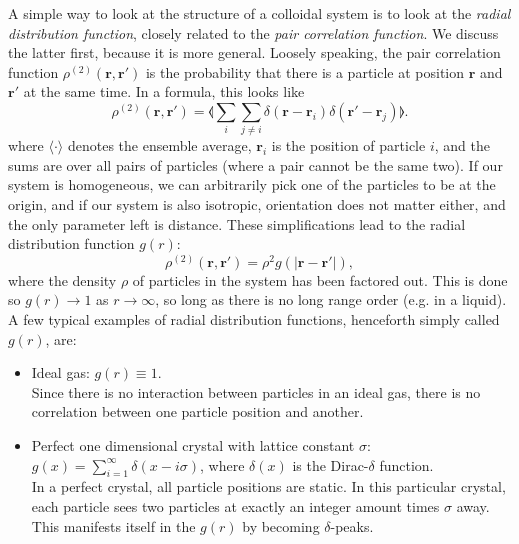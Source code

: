 \documentclass[thesis]{subfiles}
\begin{document}
A simple way to look at the structure of a colloidal system is to look at the \emph{radial distribution function}, closely related to the \emph{pair correlation function}. We discuss the latter first, because it is more general. Loosely speaking, the pair correlation function $\rho^{(2)}(\bm r, \bm r')$ is the probability that there is a particle at position $\bm r$ and $\bm r'$ at the same time. In a formula, this looks like 
\begin{equation}
	\rho^{(2)}(\bm r, \bm r') = \llangle \sum_i \sum_{j \neq i} \delta(\bm r - \bm r_i) \delta(\bm r' - \bm r_j) \rrangle.
\end{equation}
where $\langle \cdot \rangle$ denotes the ensemble average, $\bm r_i$ is the position of particle $i$, and the sums are over all pairs of particles (where a pair cannot be the same two).
If our system is homogeneous, we can arbitrarily pick one of the particles to be at the origin, and if our system is also isotropic, orientation does not matter either, and the only parameter left is distance. These simplifications lead to the radial distribution function $g(r):$
\begin{equation}
	\rho^{(2)}(\bm r, \bm r') = \rho^2 g(|\bm r - \bm r'|),
\end{equation}
where the density $\rho$ of particles in the system has been factored out. This is done so $g(r) \rightarrow 1$ as $r \rightarrow \infty$, so long as there is no long range order (e.g. in a liquid). A few typical examples of radial distribution functions, henceforth simply called $g(r)$, are:


\begin{itemize}
	\item Ideal gas: $g(r) \equiv 1$.\\
	Since there is no interaction between particles in an ideal gas, there is no correlation between one particle position and another.
\begin{comment}
	\item Dilute gas of hard spheres of diameter $\sigma$: $g(r) = \begin{cases} 0 & \textrm{if } r < \sigma, \\ 1 & \textrm{else.} \end{cases}$\\
	Since hard spheres cannot overlap, we won't find any within one diameter of another (hence the $g(r)$ is zero there). But because the gas is dilute, there is very little interaction, and it'll be equally likely to find a sphere anywhere else.
\end{comment}
	\item Perfect one dimensional crystal with lattice constant $\sigma$: $g(x) = \sum_{i = 1}^\infty \delta(x - i\sigma)$, where $\delta(x)$ is the Dirac-$\delta$ function.\\
	In a perfect crystal, all particle positions are static. In this particular crystal, each particle sees two particles at exactly an integer amount times $\sigma$ away. This manifests itself in the $g(r)$ by becoming $\delta$-peaks.
\end{itemize}
\end{document}
